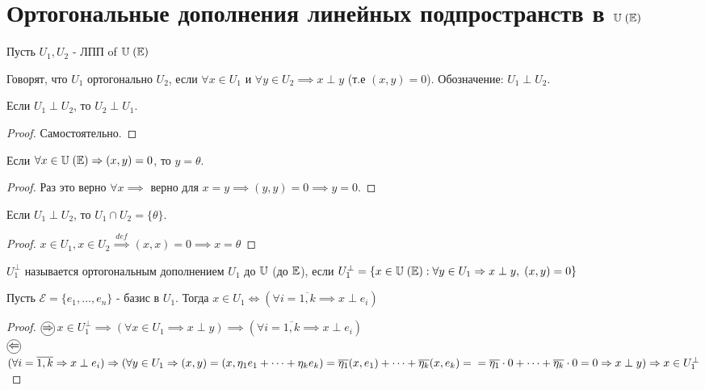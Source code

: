 \documentclass[../main.tex]{subfiles}
\begin{document}
\section{Ортогональные дополнения линейных подпространств в $\U\;(\E)$}
Пусть $U_{1},U_{2}$ - ЛПП of $\U \; (\E)$
\begin{definition}
    Говорят, что $U_{1}$ ортогонально $U_{2}$, если $\forall x \in U_{1}$ и $ \forall y \in U_{2} \implies x\perp y$ (т.е $(x,y)=0$). Обозначение: $U_{1} \perp U_{2}$.
\end{definition}
\begin{theorem}
    Если $U_{1} \perp U_{2}$, то $U_{2} \perp U_{1}$.
\end{theorem}
\begin{proof}
    Самостоятельно. 
\end{proof}
\begin{lemma}
    Если $\forall x \in \U \; (\E) \implies (x,y)  = 0$, то $y=\theta$.
\end{lemma}
\begin{proof}
    Раз это верно $\forall x \implies $ верно для $x=y \implies (y,y) = 0 \implies y=0$.
\end{proof}
\begin{theorem}
    Если $U_{1} \perp U_{2}$, то $U_{1} \cap U_{2} = \{\theta\}$.
\end{theorem}
\begin{proof}
    $x\in U_{1}, x\in U_{2} \overset{def}{\implies} (x,x) = 0 \implies x=\theta$ 
\end{proof}
\begin{definition}
    $U_{1}^{\perp}$ называется ортогональным дополнением $U_{1}$ до $\U$ (до $\E$), если $U_{1}^{\perp} = \{x \in \U \; (\E) : \\\forall y \in U_{1} \implies x\perp y, \;(x,y) = 0\}$
\end{definition}
\begin{theorem}
    Пусть $\mathcal{E} =\{e_{1},\dots,e_{n}\}$ - базис в $U_{1}$. Тогда $x\in U_{1} \Leftrightarrow (\forall i=\overline{1,k}\implies x\perp e_{i})$
\end{theorem}
\begin{proof}
    $\tcircle{$\implies$}$ $x\in U_{1}^{\perp} \implies \left(\forall x \in U_{1} \implies x\perp y \right) \implies (\forall i=\overline{1,k} \implies x \perp e_{i})$\\ 
    $\tcircle{$\impliedby$}$ $(\forall i=\overline{1,k} \implies x \perp e_{i}) \implies ( \forall y \in U_{1} \implies (x,y) = (x, \eta_{1}e_{1} + \dots + \eta_{k}e_{k}) = \overline{\eta_{1}}(x,e_{1}) + \dots + \overline{\eta_{k}}(x,e_{k}) =\\= \overline{\eta_{1}}\cdot 0 +\dots + \overline{\eta_{k}}\cdot 0 = 0 \implies x\perp y) \implies x \in U_{1}^{\perp}$
\end{proof}
\end{document}

